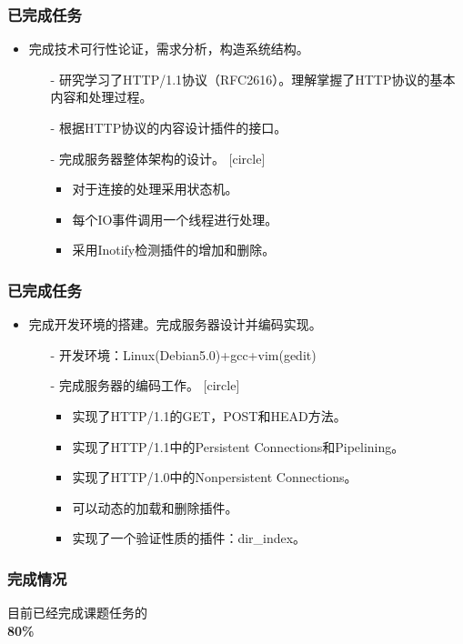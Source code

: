 \documentclass[12pt]{beamer}
\begin{document}
\begin{CJK}{UTF8}{gbsn}
\begin{frame}
	\frametitle{已完成任务}
	\begin{itemize}
		\item 完成技术可行性论证，需求分析，构造系统结构。
		\pause
		\begin{itemize}
			\item[-] 研究学习了HTTP/1.1协议（RFC2616）。理解掌握了HTTP协议的基本内容和处理过程。
			\item[-] 根据HTTP协议的内容设计插件的接口。
			\item[-] 完成服务器整体架构的设计。
			\pause
			\begin{itemize}
				\item 对于连接的处理采用状态机。
				\item 每个IO事件调用一个线程进行处理。
				\item 采用Inotify检测插件的增加和删除。
			\end{itemize}
		\end{itemize}
	\end{itemize}
\end{frame}

\begin{frame}
	\frametitle{已完成任务}
	\begin{itemize}
		\item 完成开发环境的搭建。完成服务器设计并编码实现。
		\begin{itemize}
			\item[-] 开发环境：Linux(Debian5.0)+gcc+vim(gedit)
			\item[-] 完成服务器的编码工作。
			\pause
			\begin{itemize}
				\item 实现了HTTP/1.1的GET，POST和HEAD方法。
				\item 实现了HTTP/1.1中的Persistent Connections和Pipelining。
				\item 实现了HTTP/1.0中的Nonpersistent Connections。
				\item 可以动态的加载和删除插件。
				\item 实现了一个验证性质的插件：dir\_index。
			\end{itemize}
		\end{itemize}
	\end{itemize}
\end{frame}

\begin{frame}
	\begin{center}
		\frametitle{完成情况}
		\pause
		\LARGE{目前已经完成课题任务的}\\
		{\Huge \textbf{80\%} }
		\\
	\end{center}
\end{frame}


\end{CJK}
\end{document}
